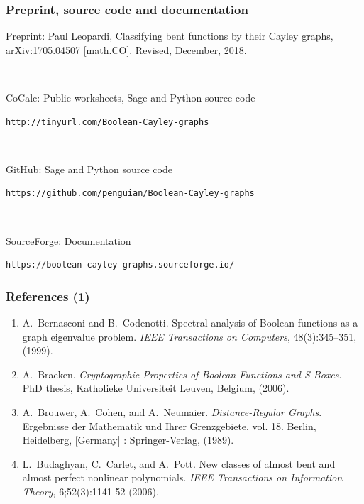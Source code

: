 \documentclass[pdf,sprung,slideColor,nocolorBG]{beamer}
\newenvironment{colortheme}[1]{
\def\ProvidesPackageRCS $##1${\relax}
\renewcommand{\ProcessOptions}{\relax}
\makeatletter

\makeatother
}{}
\begin{document}
\begin{colortheme}{jubata}

\begin{frame}[fragile]
\frametitle{Preprint, source code and documentation}
Preprint: Paul Leopardi, Classifying bent functions by their Cayley graphs,  arXiv:1705.04507 [math.CO]. Revised, December, 2018.

~

CoCalc: Public worksheets, Sage and Python source code
\begin{verbatim}
http://tinyurl.com/Boolean-Cayley-graphs
\end{verbatim}

~

GitHub: Sage and Python source code
\begin{verbatim}
https://github.com/penguian/Boolean-Cayley-graphs
\end{verbatim}

~

SourceForge: Documentation
\begin{verbatim}
https://boolean-cayley-graphs.sourceforge.io/
\end{verbatim}
\end{frame}
\begin{frame}
\frametitle{References (1)}
\small{}
\begin{enumerate}
 \item
A.~Bernasconi and B.~Codenotti.
Spectral analysis of {Boolean} functions as a graph eigenvalue
  problem.
{\em IEEE Transactions on Computers}, 48(3):345--351, (1999).
 \item
A.~Braeken.
{\em Cryptographic Properties of Boolean Functions and S-Boxes}.
{PhD} thesis, Katholieke Universiteit Leuven, Belgium, (2006).
 \item
A.~Brouwer, A.~Cohen, and A.~Neumaier.
{\em Distance-Regular Graphs}.
Ergebnisse der Mathematik und Ihrer Grenzgebiete, vol. 18.
Berlin, Heidelberg, [Germany] : Springer-Verlag, (1989).  
 \item
L.~Budaghyan, C.~Carlet, and A.~Pott.
New classes of almost bent and almost perfect nonlinear polynomials. 
{\em IEEE Transactions on Information Theory}, 6;52(3):1141-52 (2006).
\setcounter{enumisave}{\value{enumi}}
\end{enumerate}
\end{frame}


\end{colortheme}
\end{document}
